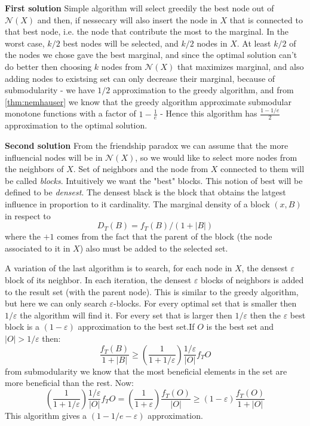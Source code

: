 \textbf{First solution}
Simple algorithm will select greedily the best node out of $\mathcal{N}(X)$ and then, if nessecary will also insert
 the node in $X$ that is connected to that best node, i.e. the node that contribute the most to the marginal. In the worst case, $k/2$ best nodes will be selected, and $k/2$ nodes in $X$. 
At least $k/2$ of the nodes we chose gave the best marginal, and since the optimal solution can't do better then choosing $k$ nodes from $\mathcal{N}(X)$ that maximizes marginal, and also adding nodes to existsing set can only decrease their marginal, because of submodularity - we have $1/2$ approximation to the greedy algorithm, and from \ref{thm:nemhauser} we know that the greedy algorithm approximate submodular monotone functions with a factor of $1-\frac{1}{e}$ - Hence this algorithm has $\frac{1-1/e}{2}$ approximation to the optimal solution.

\textbf{Second solution}
From the friendship paradox we can assume that the more influencial nodes will be in $\mathcal{N}(X)$, so we would like to select more nodes from the neighbors of $X$. Set of neighbors and the node from $X$ connected to them will be called \textit{blocks}. Intuitively we want the "best" blocks. This notion of best will be defined to be \textit{densest}. The densest black is the block that obtains the latgest influence in proportion to it cardinality. The marginal density of a block $(x,B)$ in respect to 
$$D_T(B)=f_T(B)/(1+|B|)$$ where the $+1$ comes from the fact that the parent of the block (the node associated to it in $X$) also must be added to the selected set.

 A variation of the last algorithm is to search, for each node in $X$, the densest $\varepsilon$ block of its neighbor. In each iteration, the densest $\varepsilon$ blocks of neighbors is added to the result set (with the parent node). This is similar to the greedy algorithm, but here we can only search $\varepsilon$-blocks.
For every optimal set that is smaller then $1/\varepsilon$ the algorithm will find it. For every set that is larger then $1/\varepsilon$ then the $\varepsilon$ best block is a $(1-\varepsilon)$ approximation to the best set.If $O$ is the best set and $|O|>1/\varepsilon$ then:
$$\frac{f_T(B)}{1+|B|}\ge (\frac{1}{1+1/\varepsilon})\frac{1/\varepsilon}{|O|}f_T{O}$$
from submodularity we know that the most beneficial elements in the set are more beneficial than the rest.
Now:
$$(\frac{1}{1+1/\varepsilon})\frac{1/\varepsilon}{|O|}f_T{O}=(\frac{1}{1+\varepsilon})\frac{f
_T(O)}{|O|}\ge (1-\varepsilon)\frac{f_T(O)}{1+|O|}$$
 This algorithm gives a $(1-1/e-\varepsilon)$ approximation.

